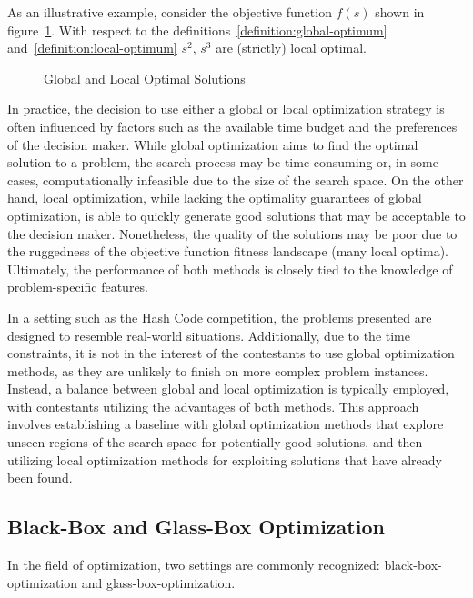 As an illustrative example, consider the objective function $f(s)$ shown in
figure~\ref{fig:maxima}. With respect to the definitions~\ref{definition:global-optimum}
and~\ref{definition:local-optimum} $s^2$, $s^3$ are (strictly) local optimal.

\begin{figure}[h]
    \centering
    
    \caption{Global and Local Optimal Solutions}
    \label{fig:maxima}
\end{figure}

In practice, the decision to use either a global or local optimization strategy
is often influenced by factors such as the available time budget and the
preferences of the decision maker. While global optimization aims to find the
optimal solution to a problem, the search process may be time-consuming or, in
some cases, computationally infeasible due to the size of the search space.
On the other hand, local optimization, while lacking the optimality guarantees
of global optimization, is able to quickly generate good solutions that may
be acceptable to the decision maker. Nonetheless, the quality of the solutions
may be poor due to the ruggedness of the objective function fitness landscape
(many local optima). Ultimately, the performance of both methods is closely
tied to the knowledge of problem-specific features.

In a setting such as the Hash Code competition, the problems presented are
designed to resemble real-world situations. Additionally, due to the time
constraints, it is not in the interest of the contestants to use global optimization
methods, as they are unlikely to finish on more complex problem instances.
Instead, a balance between global and local optimization is typically employed,
with contestants utilizing the advantages of both methods. This approach
involves establishing a baseline with global optimization methods that explore
unseen regions of the search space for potentially good solutions, and then
utilizing local optimization methods for exploiting solutions that have
already been found.

\subsection{Black-Box and Glass-Box Optimization}

In the field of optimization, two settings are commonly recognized:
\acrfull{black-box-optimization} and \acrfull{glass-box-optimization}.

